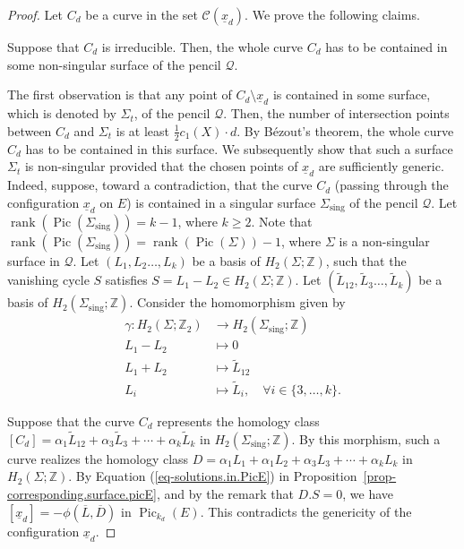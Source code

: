 \documentclass[11pt]{amsart}
\numberwithin{equation}{section}
\theoremstyle{definition}
\theoremstyle{plain}
\theoremstyle{remark}
\newenvironment{claim}[1]{\renewcommand\theinnercustomclaim{#1}\innercustomclaim}{\endinnercustomclaim}
\newcommand{\Z}{\mathbb{Z}}
\DeclareMathOperator{\Pic}{Pic}
\DeclareMathOperator{\rank}{rank}
\newcommand{\sing}{\mathrm{sing}}
\newcommand{\lra}{\longrightarrow}
\begin{document}
 \begin{proof}
Let $C_d$ be a curve in the set $\mathcal{C}(\underline{x}_d)$. We prove the following claims.

\begin{claim}{1}\label{claim3.2-1}
Suppose that $C_d$ is irreducible. Then,  the whole curve $C_d$ has to be contained in some non-singular surface of the pencil $\mathcal{Q}$.
\end{claim}

The first observation is that any point of $C_d\setminus\underline{x}_d$ is contained in some  surface, which is denoted by $\Sigma_t$, of the pencil $\mathcal{Q}$. Then, the number of intersection points between $C_d$ and  $\Sigma_t$ is at least $\frac{1}{2}c_1(X)\cdot d$. By B\'ezout's theorem, the whole curve $C_d$ has to be contained in this surface. We subsequently show that such a surface $\Sigma_t$ is non-singular provided that the chosen points of $\underline{x}_d$ are sufficiently generic. Indeed, suppose, toward a contradiction, that the curve $C_d$ (passing through the configuration $\underline{x}_d$ on $E$) is contained in a singular surface $\Sigma_{\sing}$ of the pencil $\mathcal{Q}$. Let $\rank(\Pic(\Sigma_{\sing}))=k-1$, where  $k\geq 2$. Note that  $\rank(\Pic(\Sigma_{\sing}))=\rank(\Pic(\Sigma))-1$, where $\Sigma$ is a non-singular surface in $\mathcal{Q}$. Let $(L_1,L_2\ldots,L_k)$ be a basis of $ H_2(\Sigma;\Z)$, such that the vanishing cycle $S$ satisfies $S=L_1-L_2\in H_2(\Sigma;\Z)$. Let $(\tilde{L}_{12},\tilde{L}_3\ldots,\tilde{L}_k)$ be a basis of $ H_2(\Sigma_{\sing};\Z)$. Consider the  homomorphism given by
\begin{align*}
    \gamma\colon H_2(\Sigma;\Z_2)&\lra H_2(\Sigma_{\sing};\Z)\\
    L_1-L_2& \longmapsto 0 \\
    L_1+L_2& \longmapsto \tilde{L}_{12}\\
    L_i & \longmapsto \tilde{L}_i,\quad \forall i \in \{3,\ldots,k\}.
\end{align*}

Suppose that the curve $C_d$ represents the homology class $[C_d]=\alpha_{1}\tilde{L}_{12}+\alpha_3 \tilde{L}_3+\cdots + \alpha_k \tilde{L}_k$ in $H_2(\Sigma_{\sing};\Z)$. By this morphism, such a curve realizes the homology class $D=\alpha_{1}L_{1}+\alpha_1 L_2+\alpha_3 L_3+\cdots + \alpha_k L_k$ in $H_2(\Sigma;\Z)$. By Equation (\ref{eq-solutions.in.PicE}) in Proposition~\ref{prop-corresponding.surface.picE}, and by the remark that $D.S=0$, we have
$[\underline{x}_d]=-\phi (\overline{L},\overline{D})$ in $\Pic_{k_d}(E)$. This contradicts the genericity of the configuration $\underline{x}_d$. 


\end{proof}
\end{document}
